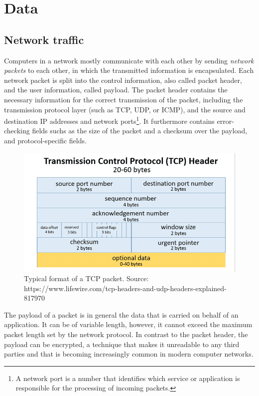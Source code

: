 \documentclass[a4paper,12pt,twoside]{report}
\begin{document}
\chapter{Data}

\section{Network traffic}\label{traffic}



Computers in a network mostly communicate with each other by sending \textit{network packets} to each other, in which the transmitted information is encapsulated. Each network packet is split into the control information, also called packet header, and the user information, called payload. The packet header contains the necessary information for the correct transmission of the packet, including the transmission protocol layer (such as TCP, UDP, or ICMP), and the source and destination IP addresses and network ports\footnote{A network port is a number that identifies which service or application is responsible for the processing of incoming packets.}. It furthermore contains error-checking fields suchs as the size of the packet and a checksum over the payload, and protocol-specific fields. 


\begin{figure}[h!]
\centering
\includegraphics[scale=0.4]{tcp_header.png}
\caption{Typical format of a TCP packet. Source:\scriptsize{ https://www.lifewire.com/tcp-headers-and-udp-headers-explained-817970}\normalsize}
\end{figure}


The payload of a packet is in general the data that is carried on behalf of an application. It can be of variable length, however, it cannot exceed the maximum packet length set by the network protocol. In contrast to the packet header, the payload can be encrypted, a technique that makes it unreadable to any third parties and that is becoming increasingly common in modern computer networks. 
\end{document}
